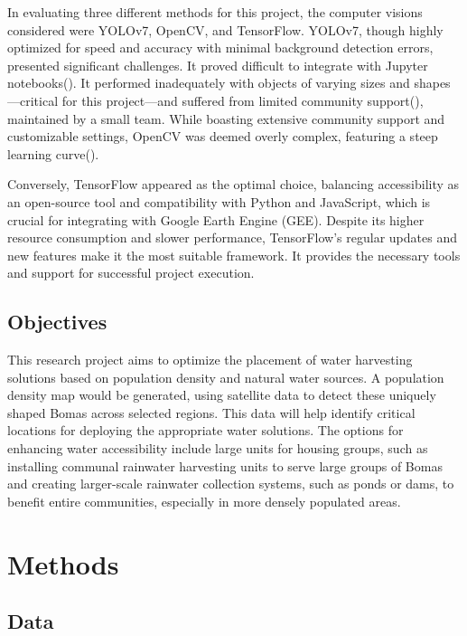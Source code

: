 \documentclass[10pt]{article}
\begin{document}
In evaluating three different methods for this project, the computer visions considered were YOLOv7, OpenCV, and TensorFlow. YOLOv7, though highly optimized for speed and accuracy with minimal background detection errors, presented significant challenges. It proved difficult to integrate with Jupyter notebooks(\autocite{s23135849}). It performed inadequately with objects of varying sizes and shapes—critical for this project—and suffered from limited community support(\autocite{IJERTV10IS060287}), maintained by a small team. While boasting extensive community support and customizable settings, OpenCV was deemed overly complex, featuring a steep learning curve(\autocite{9174593}).

Conversely, TensorFlow appeared as the optimal choice, balancing accessibility as an open-source tool and compatibility with Python and JavaScript, which is crucial for integrating with Google Earth Engine (GEE).
Despite its higher resource consumption and slower performance, TensorFlow's regular updates and new features make it the most suitable framework. It provides the necessary tools and support for successful project execution.

\subsection{Objectives}

This research project aims to optimize the placement of water harvesting solutions based on population density and natural water sources. A population density map would be generated, using satellite data to detect these uniquely shaped Bomas across selected regions. This data will help identify critical locations for deploying the appropriate water solutions. The options for enhancing water accessibility include large units for housing groups, such as installing communal rainwater harvesting units to serve large groups of Bomas and creating larger-scale rainwater collection systems, such as ponds or dams, to benefit entire communities, especially in more densely populated areas.


\section{Methods}
\label{methods}

\subsection{Data}
\end{document}
